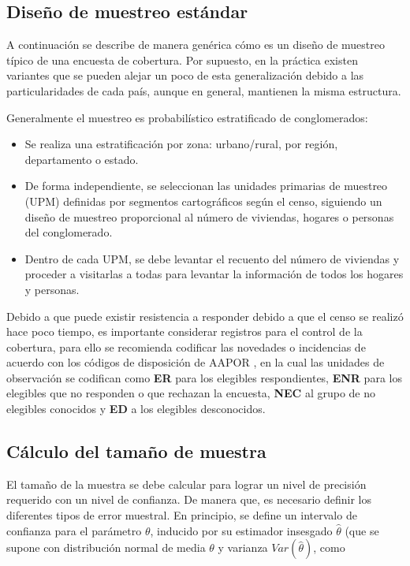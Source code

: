 \documentclass[
  12pt,
]{book}
\providecommand{\tightlist}{%
  \setlength{\itemsep}{0pt}\setlength{\parskip}{0pt}}
\begin{document}
\subsection{Diseño de muestreo estándar}\label{diseuxf1o-de-muestreo-estuxe1ndar}

A continuación se describe de manera genérica cómo es un diseño de muestreo típico de una encuesta de cobertura. Por supuesto, en la práctica existen variantes que se pueden alejar un poco de esta generalización debido a las particularidades de cada país, aunque en general, mantienen la misma estructura.

Generalmente el muestreo es probabilístico estratificado de conglomerados:

\begin{itemize}
\tightlist
\item
  Se realiza una estratificación por zona: urbano/rural, por región, departamento o estado.
\item
  De forma independiente, se seleccionan las unidades primarias de muestreo (UPM) definidas por segmentos cartográficos según el censo, siguiendo un diseño de muestreo proporcional al número de viviendas, hogares o personas del conglomerado.
\item
  Dentro de cada UPM, se debe levantar el recuento del número de viviendas y proceder a visitarlas a todas para levantar la información de todos los hogares y personas.
\end{itemize}

Debido a que puede existir resistencia a responder debido a que el censo se realizó hace poco tiempo, es importante considerar registros para el control de la cobertura, para ello se recomienda codificar las novedades o incidencias de acuerdo con los códigos de disposición de AAPOR \citep{american2016standard}, en la cual las unidades de observación se codifican como \textbf{ER} para los elegibles respondientes, \textbf{ENR} para los elegibles que no responden o que rechazan la encuesta, \textbf{NEC} al grupo de no elegibles conocidos y \textbf{ED} a los elegibles desconocidos.

\subsection{Cálculo del tamaño de muestra}\label{cuxe1lculo-del-tamauxf1o-de-muestra}

El tamaño de la muestra se debe calcular para lograr un nivel de precisión requerido con un nivel de confianza. De manera que, es necesario definir los diferentes tipos de error muestral. En principio, se define un intervalo de confianza para el parámetro \(\theta\), inducido por su estimador insesgado \(\hat{\theta}\) (que se supone con distribución normal de media \(\theta\) y varianza \(Var(\hat{\theta})\), como
\end{document}
